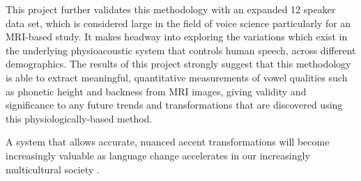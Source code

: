 This project further validates this methodology with an expanded 12 speaker data set, which is considered large in the field of voice science particularly for an MRI-based study. It makes headway into exploring the variations which exist in the underlying physioacoustic system that controls human speech, across different demographics. The results of this project strongly suggest that this methodology is able to extract meaningful, quantitative measurements of vowel qualities such as phonetic height and backness from MRI images, giving validity and significance to any future trends and transformations that are discovered using this physiologically-based method.

A system that allows accurate, nuanced accent transformations will become increasingly valuable as language change accelerates in our increasingly multicultural society \cite{jacewicz2016acoustics}.